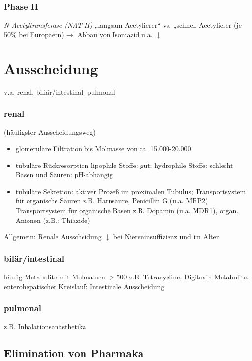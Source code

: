 \documentclass[10pt,a4paper]{report}
\begin{document}
\subsubsection{Phase II}
\textit{N-Acetyltransferase (NAT II)}		„langsam Acetylierer“ vs. „schnell Acetylierer (je 50\% bei Europäern)$\rightarrow$ Abbau von Isoniazid u.a. $\downarrow$


\section{Ausscheidung} 
v.a. renal, biliär/intestinal, pulmonal

\subsubsection{renal}
(häufigster Ausscheidungsweg)

\begin{itemize}
	\item glomeruläre Filtration bis Molmasse von ca. 15.000-20.000
	\item tubuläre Rückresorption lipophile Stoffe: gut; hydrophile Stoffe: schlecht Basen und Säuren: pH-abhängig
	\item tubuläre Sekretion: aktiver Prozeß im proximalen Tubulus; Transportsystem für organische Säuren z.B. Harnsäure, Penicillin G (u.a. MRP2) Transportsystem für organische Basen z.B. Dopamin (u.a. MDR1), organ. Anionen (z.B.: Thiazide)
\end{itemize}

Allgemein: Renale Ausscheidung $\downarrow$ bei Niereninsuffizienz und im Alter

\subsubsection{bilär/intestinal} 
häufig Metabolite mit Molmassen $>$500 z.B. Tetracycline, Digitoxin-Metabolite.\\
enterohepatischer Kreislauf: Intestinale Ausscheidung

\subsubsection{pulmonal}
z.B. Inhalationsanästhetika

\subsection{Elimination von Pharmaka} \mbox{} \\
\end{document}
